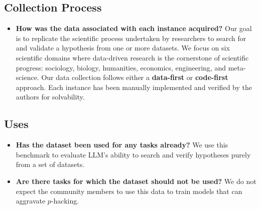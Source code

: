 

\subsection{Collection Process}

\begin{itemize}
    \item \textbf{How was the data associated with each instance acquired?}
    Our goal is to replicate the scientific process undertaken by researchers to search for and validate a hypothesis from one or more datasets. We focus on six scientific domains where data-driven research is the cornerstone of scientific progress: sociology, biology, humanities, economics, engineering, and meta-science. Our data collection follows either a \textbf{data-first} or \textbf{code-first} approach. Each instance has been manually implemented and verified by the authors for solvability.
\end{itemize}

\subsection{Uses}
\begin{itemize}
    \item \textbf{Has the dataset been used for any tasks already?}
    We use this benchmark to evaluate LLM's ability to search and verify hypotheses purely from a set of datasets.
    \item \textbf{Are there tasks for which the dataset should not be used?} We do not expect the community members to use this data to train models that can aggravate $p$-hacking.
\end{itemize}

